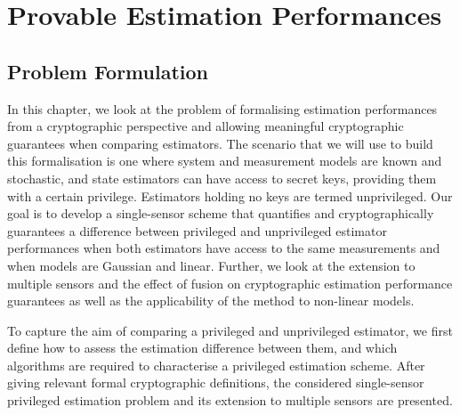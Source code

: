 
\chapter{Provable Estimation Performances}\label{ch:priv_estimation}

% 
%                                              
%                                              
%                                              
% 

\section{Problem Formulation}\label{sec:priv_estimation:problem}
In this chapter, we look at the problem of formalising estimation performances from a cryptographic perspective and allowing meaningful cryptographic guarantees when comparing estimators. The scenario that we will use to build this formalisation is one where system and measurement models are known and stochastic, and state estimators can have access to secret keys, providing them with a certain privilege. Estimators holding no keys are termed unprivileged. Our goal is to develop a single-sensor scheme that quantifies and cryptographically guarantees a difference between privileged and unprivileged estimator performances when both estimators have access to the same measurements and when models are Gaussian and linear. Further, we look at the extension to multiple sensors and the effect of fusion on cryptographic estimation performance guarantees as well as the applicability of the method to non-linear models.

To capture the aim of comparing a privileged and unprivileged estimator, we first define how to assess the estimation difference between them, and which algorithms are required to characterise a privileged estimation scheme. After giving relevant formal cryptographic definitions, the considered single-sensor privileged estimation problem and its extension to multiple sensors are presented.

% 
% 

